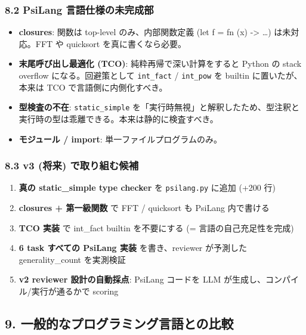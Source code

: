 \documentclass[
]{ltjsarticle}
\providecommand{\tightlist}{%
  \setlength{\itemsep}{0pt}\setlength{\parskip}{0pt}}
\begin{document}
\subsubsection{8.2 PsiLang
言語仕様の未完成部}\label{psilang-ux8a00ux8a9eux4ed5ux69d8ux306eux672aux5b8cux6210ux90e8}

\begin{itemize}
\tightlist
\item
  \textbf{closures}: 関数は top-level のみ、内部関数定義 (let f = fn (x)
  -\textgreater{} \ldots) は未対応。FFT や quicksort
  を真に書くなら必要。
\item
  \textbf{末尾呼び出し最適化 (TCO)}: 純粋再帰で深い計算をすると Python
  の stack overflow になる。回避策として \texttt{int\_fact} /
  \texttt{int\_pow} を builtin に置いたが、本来は TCO
  で言語側に内側化すべき。
\item
  \textbf{型検査の不在}: \texttt{static\_simple}
  を「実行時無視」と解釈したため、型注釈と実行時の型は乖離できる。本来は静的に検査すべき。
\item
  \textbf{モジュール / import}: 単一ファイルプログラムのみ。
\end{itemize}

\subsubsection{8.3 v3 (将来)
で取り組む候補}\label{v3-ux5c06ux6765-ux3067ux53d6ux308aux7d44ux3080ux5019ux88dc}

\begin{enumerate}
\def\labelenumi{\arabic{enumi}.}
\tightlist
\item
  \textbf{真の static\_simple type checker} を \texttt{psilang.py}
  に追加 (+200 行)
\item
  \textbf{closures + 第一級関数} で FFT / quicksort も PsiLang
  内で書ける
\item
  \textbf{TCO 実装} で int\_fact builtin を不要にする (=
  言語の自己充足性を完成)
\item
  \textbf{6 task すべての PsiLang 実装} を書き、reviewer が予測した
  generality\_count を実測検証
\item
  \textbf{v2 reviewer 設計の自動採点}: PsiLang コードを LLM
  が生成し、コンパイル/実行が通るかで scoring
\end{enumerate}

\subsection{9.
一般的なプログラミング言語との比較}\label{ux4e00ux822cux7684ux306aux30d7ux30edux30b0ux30e9ux30dfux30f3ux30b0ux8a00ux8a9eux3068ux306eux6bd4ux8f03}
\end{document}
